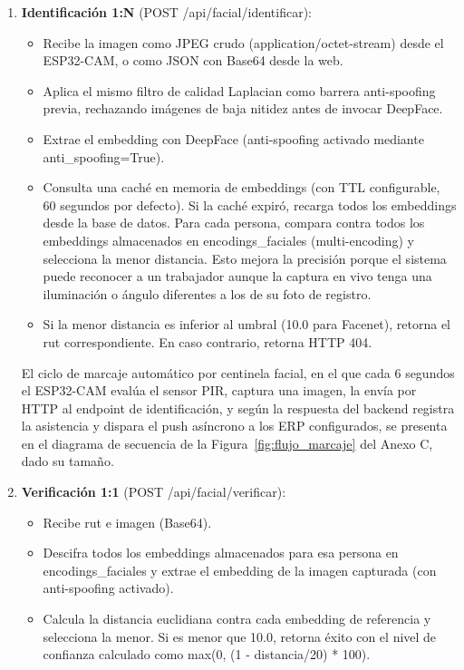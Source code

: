 \begin{enumerate}
    \item \textbf{Identificación 1:N} (POST /api/facial/identificar):
    \begin{itemize}
        \item Recibe la imagen como JPEG crudo (application/octet-stream) desde el ESP32-CAM, o como JSON con Base64 desde la web.
        \item Aplica el mismo filtro de calidad Laplacian como barrera anti-spoofing previa, rechazando imágenes de baja nitidez antes de invocar DeepFace.
        \item Extrae el embedding con DeepFace (anti-spoofing activado mediante anti\_spoofing=True).
        \item Consulta una caché en memoria de embeddings (con TTL configurable, 60 segundos por defecto). Si la caché expiró, recarga todos los embeddings desde la base de datos. Para cada persona, compara contra todos los embeddings almacenados en encodings\_faciales (multi-encoding) y selecciona la menor distancia. Esto mejora la precisión porque el sistema puede reconocer a un trabajador aunque la captura en vivo tenga una iluminación o ángulo diferentes a los de su foto de registro.
        \item Si la menor distancia es inferior al umbral (10.0 para Facenet), retorna el rut correspondiente. En caso contrario, retorna HTTP 404.
    \end{itemize}

    El ciclo de marcaje automático por centinela facial, en el que cada 6 segundos el ESP32-CAM evalúa el sensor PIR, captura una imagen, la envía por HTTP al endpoint de identificación, y según la respuesta del backend registra la asistencia y dispara el push asíncrono a los ERP configurados, se presenta en el diagrama de secuencia de la Figura~\ref{fig:flujo_marcaje} del Anexo C, dado su tamaño.

    \item \textbf{Verificación 1:1} (POST /api/facial/verificar):
    \begin{itemize}
        \item Recibe rut e imagen (Base64).
        \item Descifra todos los embeddings almacenados para esa persona en encodings\_faciales y extrae el embedding de la imagen capturada (con anti-spoofing activado).
        \item Calcula la distancia euclidiana contra cada embedding de referencia y selecciona la menor. Si es menor que 10.0, retorna éxito con el nivel de confianza calculado como max(0, (1 - distancia/20) * 100).
    \end{itemize}
\end{enumerate}

